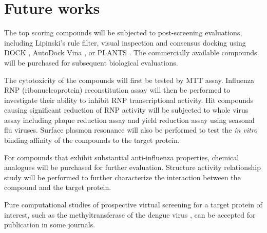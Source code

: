 \section{Future works}

The top scoring compounds will be subjected to post-screening evaluations, including Lipinski's rule filter, visual inspection and consensus docking using DOCK \citep{1222}, AutoDock Vina \citep{595}, or PLANTS \citep{610,607,779}. The commercially available compounds will be purchased for subsequent biological evaluations.

The cytotoxicity of the compounds will first be tested by MTT assay. Influenza RNP (ribonucleoprotein) reconstitution assay will then be performed to investigate their ability to inhibit RNP transcriptional activity. Hit compounds causing significant reduction of RNP activity will be subjected to whole virus assay including plaque reduction assay and yield reduction assay using seasonal flu viruses. Surface plasmon resonance will also be performed to test the \textit{in vitro} binding affinity of the compounds to the target protein. 

For compounds that exhibit substantial anti-influenza properties, chemical analogues will be purchased for further evaluation. Structure activity relationship study will be performed to further characterize the interaction between the compound and the target protein.

Pure computational studies of prospective virtual screening for a target protein of interest, such as the methyltransferase of the dengue virus \citep{1435}, can be accepted for publication in some journals.

\chapterend
